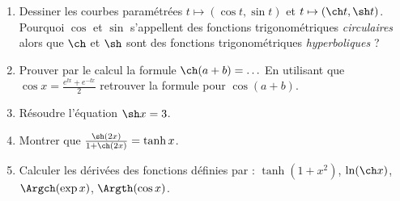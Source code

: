 \documentclass[class=report,crop=false]{standalone}
\begin{document}

\begin{miniexercices}
\sauteligne
\begin{enumerate}
  \item Dessiner les courbes paramétrées $t \mapsto (\cos t, \sin t)$ et $t \mapsto (\ch t, \sh t)$.
Pourquoi $\cos$ et $\sin$ s'appellent des fonctions trigonométriques \emph{circulaires} alors que
$\ch$ et $\sh$ sont des fonctions trigonométriques \emph{hyperboliques} ?
  \item Prouver par le calcul la formule $\ch(a+b)=\ldots$ En utilisant que $\cos x = \frac{e^{\ii x}+e^{-\ii x}}{2}$
retrouver la formule pour $\cos(a+b)$.
  \item Résoudre l'équation $\sh x = 3$.
  \item Montrer que $\frac{\sh(2x)}{1+\ch(2x)} = \tanh x$.
  \item Calculer les dérivées des fonctions définies par :
  $\tanh(1+x^2)$, $\ln(\ch x)$, $\Argch(\exp x)$, $\Argth(\cos x)$.
\end{enumerate}
\end{miniexercices}


\bigskip
\bigskip


\finchapitre
\end{document}
